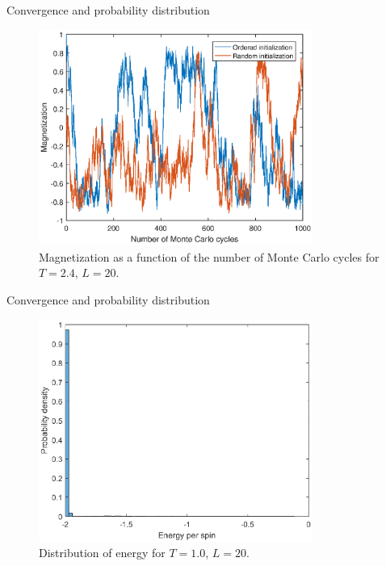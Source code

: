 \documentclass{beamer}
\begin{document}
\begin{frame}{Convergence and probability distribution}
\begin{figure}
\includegraphics[width=0.8\textwidth]{Process_mag_highT.eps}
\caption{Magnetization as a function of the number of Monte Carlo cycles for $T=2.4$, $L=20$. }
\end{figure}
\end{frame}

\begin{frame}{Convergence and probability distribution}
\begin{figure}
	\includegraphics[width=0.8\textwidth]{Prob_ene_lowT.eps}
	\caption{Distribution of energy for $T=1.0$, $L=20$. }
\end{figure}
\end{frame}
\end{document}
